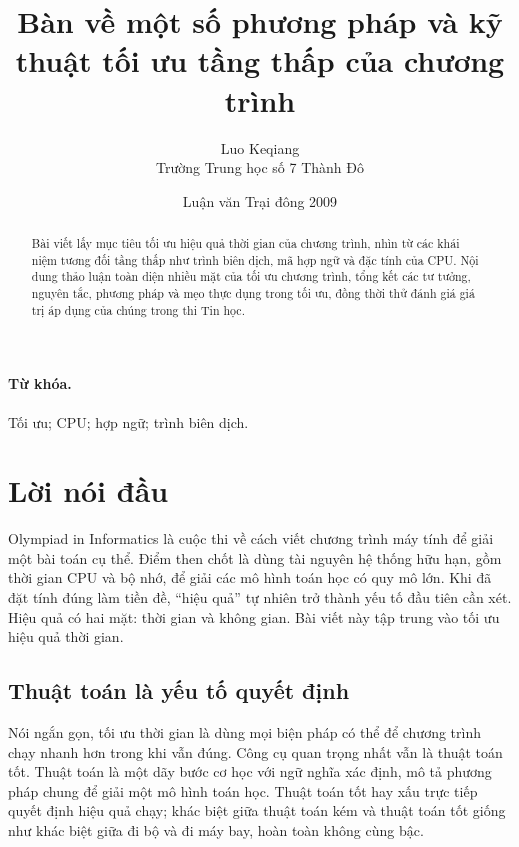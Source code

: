 \documentclass[11pt]{article}
\title{Bàn về một số phương pháp và kỹ thuật tối ưu tầng thấp của chương trình}
\author{Luo Keqiang\\Trường Trung học số 7 Thành Đô}
\date{Luận văn Trại đông 2009}
\begin{document}
\maketitle


\begin{abstract}
Bài viết lấy mục tiêu tối ưu hiệu quả thời gian của chương trình, nhìn từ các
khái niệm tương đối tầng thấp như trình biên dịch, mã hợp ngữ và đặc tính của
CPU. Nội dung thảo luận toàn diện nhiều mặt của tối ưu chương trình, tổng kết
các tư tưởng, nguyên tắc, phương pháp và mẹo thực dụng trong tối ưu, đồng thời
thử đánh giá giá trị áp dụng của chúng trong thi Tin học.
\end{abstract}

\paragraph{Từ khóa.}
Tối ưu; CPU; hợp ngữ; trình biên dịch.

\tableofcontents

\section{Lời nói đầu}

Olympiad in Informatics là cuộc thi về cách viết chương trình máy tính để giải
một bài toán cụ thể. Điểm then chốt là dùng tài nguyên hệ thống hữu hạn, gồm
thời gian CPU và bộ nhớ, để giải các mô hình toán học có quy mô lớn. Khi đã
đặt tính đúng làm tiền đề, ``hiệu quả'' tự nhiên trở thành yếu tố đầu tiên
cần xét. Hiệu quả có hai mặt: thời gian và không gian. Bài viết này tập trung
vào tối ưu hiệu quả thời gian.

\subsection{Thuật toán là yếu tố quyết định}

Nói ngắn gọn, tối ưu thời gian là dùng mọi biện pháp có thể để chương trình
chạy nhanh hơn trong khi vẫn đúng. Công cụ quan trọng nhất vẫn là thuật toán
tốt. Thuật toán là một dãy bước cơ học với ngữ nghĩa xác định, mô tả phương
pháp chung để giải một mô hình toán học. Thuật toán tốt hay xấu trực tiếp
quyết định hiệu quả chạy; khác biệt giữa thuật toán kém và thuật toán tốt
giống như khác biệt giữa đi bộ và đi máy bay, hoàn toàn không cùng bậc.
\end{document}
